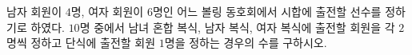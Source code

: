 \hspace*{2mm}\begin{minipage}[t]{\dimexpr\linewidth-2mm\relax}\vspace{0pt}
남자 회원이 $4$명, 여자 회원이 $6$명인 어느 볼링 동호회에서 시합에 출전할 선수를 정하기로 하였다. $10$명 중에서 남녀 혼합 복식, 남자 복식, 여자 복식에 출전할 회원을 각 $2$명씩 정하고 단식에 출전할 회원 $1$명을 정하는 경우의 수를 구하시오. \end{minipage}
